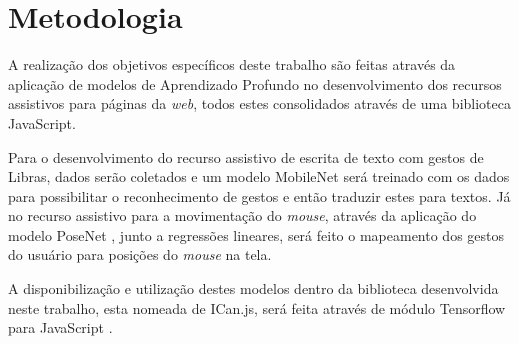 \section{Metodologia} %

\par A realização dos objetivos específicos deste trabalho são feitas através da aplicação de modelos de Aprendizado Profundo no desenvolvimento dos recursos assistivos para páginas da \textit{web}, todos estes consolidados através de uma biblioteca JavaScript.

\par Para o desenvolvimento do recurso assistivo de escrita de texto com gestos de Libras, dados serão coletados e um modelo MobileNet \cite{howard2017mobilenets} será treinado com os dados para possibilitar o reconhecimento de gestos e então traduzir estes para textos. Já no recurso assistivo para a movimentação do \textit{mouse}, através da aplicação do modelo PoseNet \cite{PoseNetMedium2019}, junto a regressões lineares, será feito o mapeamento dos gestos do usuário para posições do \textit{mouse} na tela.

\par A disponibilização e utilização destes modelos dentro da biblioteca desenvolvida neste trabalho, esta nomeada de ICan.js, será feita através de módulo Tensorflow para JavaScript \cite{tensorflowjs2019}.




